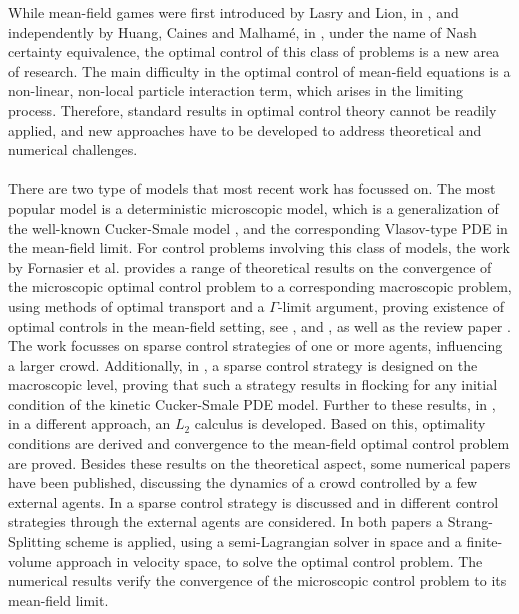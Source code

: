 \documentclass[11pt, a4paper]{article}
\theoremstyle{definition}
\begin{document}
While mean-field games were first introduced by Lasry and Lion, in \cite{Lasry2007}, and independently by Huang, Caines and Malham\'e, in \cite{Huang1}, under the name of Nash certainty equivalence, the optimal control of this class of problems is a new area of research. The main difficulty in the optimal control of mean-field equations is a non-linear, non-local particle interaction term, which arises in the limiting process. Therefore, standard results in optimal control theory cannot be readily applied, and new approaches have to be developed to address theoretical and numerical challenges.
\\
\\
There are two type of models that most recent work has focussed on. The most popular model is a deterministic microscopic model, which is a generalization of the well-known Cucker-Smale model \cite{CuckerSmale1}\cite{CuckerSmale2}, and the corresponding Vlasov-type PDE in the mean-field limit. For control problems involving this class of models, the work by Fornasier et al. provides a range of theoretical results on the convergence of the microscopic optimal control problem to a corresponding macroscopic problem, using methods of optimal transport and a $\Gamma$-limit argument, proving existence of optimal controls in the mean-field setting, see \cite{Fornasier_2014},
\cite{Fornasier_2014no2}
and \cite{fornasier_lisini_orrieri_savare_2019}, as well as the review paper \cite{Fornasier_20161no1}. The work focusses on sparse control strategies of one or more agents, influencing a larger crowd.
Additionally, in \cite{piccoli2014no1}, a sparse control strategy is designed on the macroscopic level, proving that such a strategy results in flocking for any initial condition of the kinetic Cucker-Smale PDE model.
Further to these results, in \cite{burger2019meanfield}, in a different approach, an $L_2$ calculus is developed. Based on this, optimality conditions are derived and convergence to the mean-field optimal control problem are proved.
Besides these results on the theoretical aspect, some numerical papers have been published, discussing the dynamics of a crowd controlled by a few external agents. In \cite{burger2019instantaneous} a sparse control strategy is discussed and in \cite{burger2016controlling} different control strategies through the external agents are considered. In both papers a Strang-Splitting scheme is applied, using a semi-Lagrangian solver in space and a finite-volume approach in velocity space, to solve the optimal control problem. The numerical results verify the convergence of the microscopic control problem to its mean-field limit.
\end{document}
